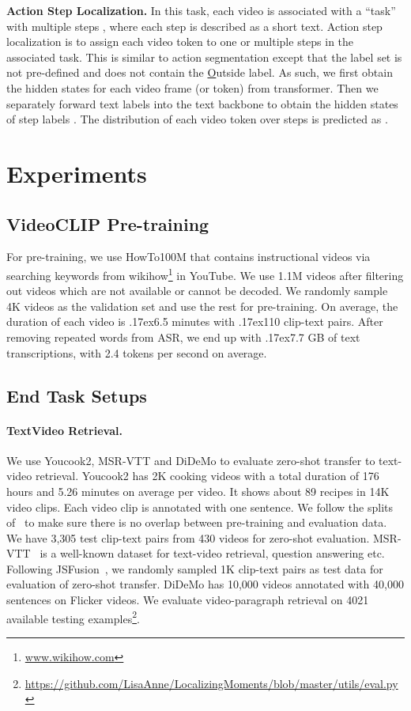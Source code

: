 \documentclass[11pt]{article}
\newcommand{\app}{\raise.17ex\hbox{}}
\begin{document}
\noindent\textbf{Action Step Localization.}
In this task, each video is associated with a ``task'' with multiple steps , where each step  is described as a short text.
Action step localization is to assign each video token to one or multiple steps in the associated task.
This is similar to action segmentation except that the label set is not pre-defined and does not contain the \underline{O}utside label.
As such, we first obtain the hidden states for each video frame (or token)  from transformer. Then we separately forward text labels into the text backbone to obtain the hidden states of step labels .
The distribution of each video token over steps is predicted as .

\section{Experiments}
\label{sec:exp}


\subsection{VideoCLIP Pre-training}
For pre-training, we use HowTo100M \cite{miech2019howto100m} that contains instructional videos via searching keywords from wikihow\footnote{\url{www.wikihow.com}} in YouTube. 
We use 1.1M videos after filtering out videos which are not available or cannot be decoded.
We randomly sample 4K videos as the validation set and use the rest for pre-training.
On average, the duration of each video is \app6.5 minutes with \app110 clip-text pairs.
After removing repeated words from ASR, we end up with \app7.7 GB of text transcriptions, with 2.4 tokens per second on average.

\subsection{End Task Setups}
\paragraph{TextVideo Retrieval.} We use Youcook2, MSR-VTT and DiDeMo to evaluate zero-shot transfer to text-video retrieval.
Youcook2 \cite{zhou2017towards} has 2K cooking videos with a total duration of 176 hours and 5.26 minutes on average per video.
It shows about 89 recipes in 14K video clips.
Each video clip is annotated with one sentence. 
We follow the splits of~\citet{miech2019howto100m} to make sure there is no overlap between pre-training and evaluation data. 
We have 3,305 test clip-text pairs from 430 videos for zero-shot evaluation.
MSR-VTT~\cite{xu2016msr} is a well-known dataset for text-video retrieval, question answering etc.
Following JSFusion~\cite{yu2018joint,miech2019howto100m}, we randomly sampled 1K clip-text pairs as test data for evaluation of zero-shot transfer.
DiDeMo \cite{anne2017localizing} has 10,000 videos annotated with 40,000 sentences on Flicker videos. We evaluate video-paragraph retrieval on 4021 available testing examples\footnote{\url{https://github.com/LisaAnne/LocalizingMoments/blob/master/utils/eval.py}}.
\end{document}
